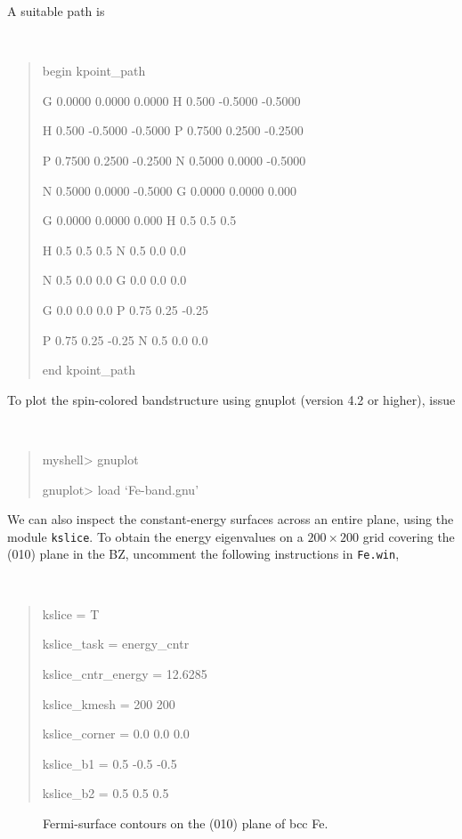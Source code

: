 \documentclass[a4paper,11pt,twoside]{article}
\begin{document}
A suitable path is
{\tt
\begin{quote}
begin kpoint\_path

G 0.0000 0.0000 0.0000   H 0.500 -0.5000 -0.5000

H 0.500 -0.5000 -0.5000  P 0.7500 0.2500 -0.2500

P 0.7500 0.2500 -0.2500  N 0.5000 0.0000 -0.5000

N 0.5000 0.0000 -0.5000  G 0.0000 0.0000 0.000

G 0.0000 0.0000 0.000    H 0.5 0.5 0.5

H 0.5 0.5 0.5            N 0.5 0.0 0.0

N 0.5 0.0 0.0            G 0.0 0.0 0.0

G 0.0 0.0 0.0            P 0.75 0.25 -0.25

P 0.75 0.25 -0.25        N 0.5 0.0 0.0

end kpoint\_path
\end{quote} }

To plot the spin-colored bandstructure using gnuplot (version 4.2 or
higher), issue
{\tt
\begin{quote}
myshell> gnuplot

gnuplot> load `Fe-band.gnu'
\end{quote} }

We can also inspect the constant-energy surfaces across an entire
plane, using the module {\tt kslice}.  To obtain the energy
eigenvalues on a $200\times 200$ grid covering the (010) plane in the
BZ, uncomment the following instructions in {\tt Fe.win}, {\tt
\begin{quote}
kslice = T

kslice\_task = energy\_cntr

kslice\_cntr\_energy = 12.6285

kslice\_kmesh = 200 200

kslice\_corner = 0.0  0.0  0.0

kslice\_b1 =     0.5 -0.5 -0.5

kslice\_b2 =     0.5  0.5  0.5
\end{quote} }

\begin{figure}[h]
\begin{center}
\caption{Fermi-surface contours on the (010) plane of bcc Fe.} 
\label{fig:fe-fermicontours}
\end{center}
\end{figure}
\end{document}
